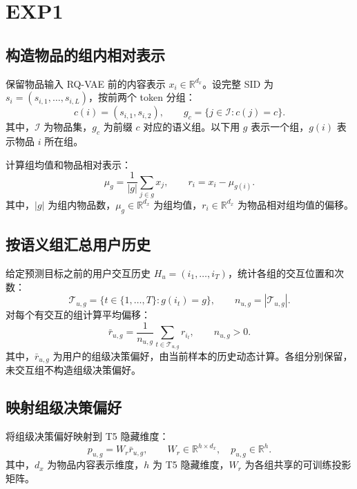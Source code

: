 \documentclass[UTF8,11pt,a4paper]{ctexart}
\begin{document}
\section{EXP1}

\subsection{构造物品的组内相对表示}

保留物品输入 RQ-VAE 前的内容表示 $x_i\in\mathbb R^{d_x}$。设完整 SID 为 $s_i=(s_{i,1},\ldots,s_{i,L})$，按前两个 token 分组：
\begin{equation}
 c(i)=(s_{i,1},s_{i,2}),\qquad
 g_c=\{j\in\mathcal I:c(j)=c\}.
\end{equation}
其中，$\mathcal I$ 为物品集，$g_c$ 为前缀 $c$ 对应的语义组。以下用 $g$ 表示一个组，$g(i)$ 表示物品 $i$ 所在组。

计算组均值和物品相对表示：
\begin{equation}
 \mu_g=\frac{1}{|g|}\sum_{j\in g}x_j,\qquad
 r_i=x_i-\mu_{g(i)}.
\end{equation}
其中，$|g|$ 为组内物品数，$\mu_g\in\mathbb R^{d_x}$ 为组均值，$r_i\in\mathbb R^{d_x}$ 为物品相对组均值的偏移。

\subsection{按语义组汇总用户历史}

给定预测目标之前的用户交互历史 $H_u=(i_1,\ldots,i_T)$，统计各组的交互位置和次数：
\begin{equation}
 \mathcal T_{u,g}=\{t\in\{1,\ldots,T\}:g(i_t)=g\},\qquad
 n_{u,g}=|\mathcal T_{u,g}|.
\end{equation}
对每个有交互的组计算平均偏移：
\begin{equation}
 \bar r_{u,g}=\frac{1}{n_{u,g}}
 \sum_{t\in\mathcal T_{u,g}}r_{i_t},\qquad n_{u,g}>0.
\end{equation}
其中，$\bar r_{u,g}$ 为用户的组级决策偏好，由当前样本的历史动态计算。各组分别保留，未交互组不构造组级决策偏好。

\subsection{映射组级决策偏好}

将组级决策偏好映射到 T5 隐藏维度：
\begin{equation}
 p_{u,g}=W_r\bar r_{u,g},\qquad
 W_r\in\mathbb R^{h\times d_x},\quad p_{u,g}\in\mathbb R^h.
\end{equation}
其中，$d_x$ 为物品内容表示维度，$h$ 为 T5 隐藏维度，$W_r$ 为各组共享的可训练投影矩阵。
\end{document}
